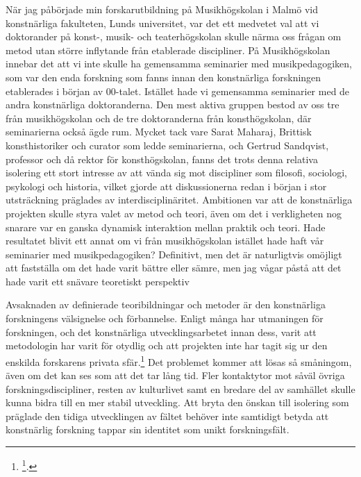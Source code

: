 \documentclass[11pt]{article}
\begin{document}
När jag påbörjade min forskarutbildning på Musikhögskolan i Malmö vid
konstnärliga fakulteten, Lunds universitet, var det ett medvetet val att
vi doktorander på konst-, musik- och teaterhögskolan skulle närma oss
frågan om metod utan större inflytande från etablerade discipliner. På
Musikhögskolan innebar det att vi inte skulle ha gemensamma seminarier
med musikpedagogiken, som var den enda forskning som fanns innan den
konstnärliga forskningen etablerades i början av 00-talet. Istället hade
vi gemensamma seminarier med de andra konstnärliga doktoranderna. Den
mest aktiva gruppen bestod av oss tre från musikhögskolan och de tre
doktoranderna från konsthögskolan, där seminarierna också ägde rum.
Mycket tack vare Sarat Maharaj, Brittisk konsthistoriker och curator som
ledde seminarierna, och Gertrud Sandqvist, professor och då rektor för
konsthögskolan, fanns det trots denna relativa isolering ett stort
intresse av att vända sig mot discipliner som filosofi, sociologi,
psykologi och historia, vilket gjorde att diskussionerna redan i början
i stor utsträckning präglades av interdisciplinäritet. Ambitionen var
att de konstnärliga projekten skulle styra valet av metod och teori,
även om det i verkligheten nog snarare var en ganska dynamisk
interaktion mellan praktik och teori. Hade resultatet blivit ett annat
om vi från musikhögskolan istället hade haft vår seminarier med
musikpedagogiken? Definitivt, men det är naturligtvis omöjligt att
fastställa om det hade varit bättre eller sämre, men jag vågar påstå att
det hade varit ett snävare teoretiskt perspektiv

Avsaknaden av definierade teoribildningar och metoder är den
konstnärliga forskningens välsignelse och förbannelse. Enligt många har
utmaningen för forskningen, och det konstnärliga utvecklingsarbetet
innan dess, varit att metodologin har varit för otydlig och att
projekten inte har tagit sig ur den enskilda forskarens privata
sfär.\footnote{\footcite[s.105]{Dunin2007}.} Det problemet kommer att lösas så småningom, även om det kan
ses som att det tar lång tid. Fler kontaktytor mot såväl övriga
forskningsdiscipliner, resten av kulturlivet samt en bredare del av
samhället skulle kunna bidra till en mer stabil utveckling. Att bryta
den önskan till isolering som präglade den tidiga utvecklingen av fältet
behöver inte samtidigt betyda att konstnärlig forskning tappar sin
identitet som unikt forskningsfält.
\end{document}
